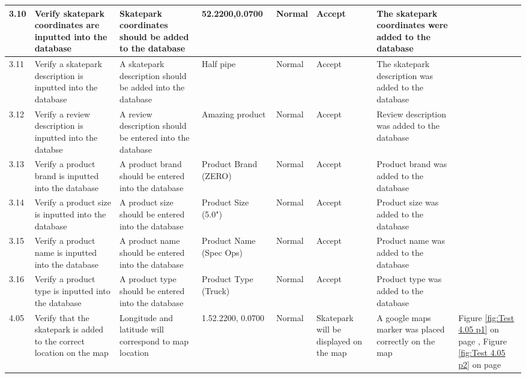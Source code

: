 \begin{landscape}
\begin{center}
\begin{longtable}{|p{1.5cm}|p{2.5cm}|p{2.5cm}|p{2cm}|p{2cm}|p{2cm}|p{2cm}|p{2cm}|}
3.10 & Verify skatepark coordinates are inputted into the database & Skatepark coordinates should be added to the database & 52.2200,0.0700 & Normal & Accept & The skatepark coordinates were added to the database & \\ \hline

3.11 & Verify a skatepark description is inputted into the database & A skatepark description should be added into the database & Half pipe & Normal & Accept & The skatepark description was added to the database & \\ \hline

3.12 & Verify a review description is inputted into the databse & A review description should be entered into the database & Amazing product & Normal & Accept & Review description was added to the database & \\ \hline
 
3.13 & Verify a product brand is inputted into the database & A product brand should be entered into the database & Product Brand (ZERO) & Normal & Accept & Product brand was added to the database & \\ \hline

3.14 & Verify a product size is inputted into the database & A product size should be entered into the database & Product Size (5.0") & Normal & Accept & Product size was added to the database & \\ \hline

3.15 & Verify a product name is inputted into the database & A product name should be entered into the database & Product Name (Spec Ops) & Normal & Accept & Product name was added to the database & \\ \hline

3.16 & Verify a product type is inputted into the database & A product type should be entered into the database & Product Type (Truck) & Normal & Accept & Product type was added to the database& \\ \hline



4.05 & Verify that the skatepark is added to the correct location on the map & Longitude and latitude will correspond to map location & 1.52.2200, 0.0700 & Normal & Skatepark will be displayed on the map & A google maps marker was placed correctly on the map & Figure \ref{fig:Test 4.05 p1} on page \pageref{fig:Test 4.05 p1}, Figure \ref{fig:Test 4.05 p2} on page \pageref{fig:Test 4.05 p2} \\ \hline





\end{longtable}
\end{center}
\end{landscape}
